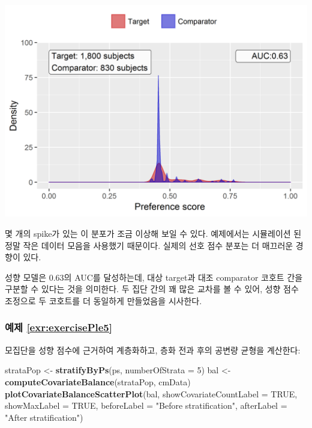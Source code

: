 \documentclass[10.5pt]{book}
\newenvironment{Shaded}{\begin{snugshade}}{\end{snugshade}}
\newcommand{\KeywordTok}[1]{\textcolor[rgb]{0.13,0.29,0.53}{\textbf{#1}}}
\newcommand{\DataTypeTok}[1]{\textcolor[rgb]{0.13,0.29,0.53}{#1}}
\newcommand{\DecValTok}[1]{\textcolor[rgb]{0.00,0.00,0.81}{#1}}
\newcommand{\StringTok}[1]{\textcolor[rgb]{0.31,0.60,0.02}{#1}}
\newcommand{\OtherTok}[1]{\textcolor[rgb]{0.56,0.35,0.01}{#1}}
\newcommand{\NormalTok}[1]{#1}
\theoremstyle{definition}
\theoremstyle{definition}
\theoremstyle{definition}
\theoremstyle{remark}
\begin{document}
\begin{center}\includegraphics[width=0.8\linewidth]{images/SuggestedAnswers/ps} \end{center}

몇 개의 spike가 있는 이 분포가 조금 이상해 보일 수 있다. 예제에서는
시뮬레이션 된 정말 작은 데이터 모음을 사용했기 때문이다. 실제의 선호
점수 분포는 더 매끄러운 경향이 있다.

성향 모델은 0.63의 AUC를 달성하는데, 대상 target과 대조 comparator
코호트 간을 구분할 수 있다는 것을 의미한다. 두 집단 간의 꽤 많은 교차를
볼 수 있어, 성향 점수 조정으로 두 코호트를 더 동일하게 만들었음을
시사한다.

\subsubsection*{예제 \ref{exr:exercisePle5}}\label{-refexrexerciseple5}

모집단을 성향 점수에 근거하여 계층화하고, 층화 전과 후의 공변량 균형을
계산한다:

\begin{Shaded}
\begin{Highlighting}[]
\NormalTok{strataPop <-}\StringTok{ }\KeywordTok{stratifyByPs}\NormalTok{(ps, }\DataTypeTok{numberOfStrata =} \DecValTok{5}\NormalTok{)}
\NormalTok{bal <-}\StringTok{ }\KeywordTok{computeCovariateBalance}\NormalTok{(strataPop, cmData)}
\KeywordTok{plotCovariateBalanceScatterPlot}\NormalTok{(bal,}
                                \DataTypeTok{showCovariateCountLabel =} \OtherTok{TRUE}\NormalTok{,}
                                \DataTypeTok{showMaxLabel =} \OtherTok{TRUE}\NormalTok{,}
                                \DataTypeTok{beforeLabel =} \StringTok{"Before stratification"}\NormalTok{,}
                                \DataTypeTok{afterLabel =} \StringTok{"After stratification"}\NormalTok{)}
\end{Highlighting}
\end{Shaded}
\end{document}
